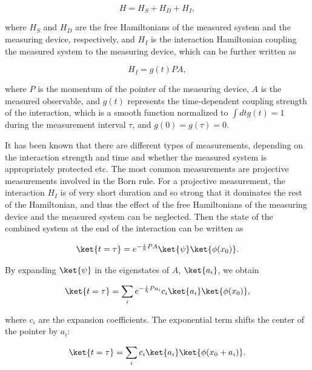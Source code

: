 \begin{equation}
H = H_S + H_D + H_I, \label{H_full}
\end{equation}

\noindent  where $H_S$ and $H_D$ are the free Hamiltonians of the measured system and the measuring device, respectively, and $H_I$ is the interaction Hamiltonian coupling the measured system to the measuring device, which can be further written as 

\begin{equation}
H_I = g(t)PA,
\label{H_int}
\end{equation} 

\noindent where $P$ is the momentum of the pointer of the measuring device, $A$ is the measured observable, and $g(t)$ represents the time-dependent coupling strength of the interaction, which is a smooth function normalized to $\int dt g(t)=1$ during the measurement interval $\tau$, and $g(0)=g(\tau)=0$. 

It has been known that there are different types of measurements, depending on the interaction strength and time and whether the measured system is appropriately protected etc. The most common measurements are projective measurements involved in the Born rule. For a projective measurement, the interaction $H_I$  is of very short duration and so strong that it dominates the rest of the Hamiltonian, and thus the effect of the free Hamiltonians of the measuring device and the measured system can be neglected. Then the state of the combined system at the end of the interaction can be written as

\begin{equation}
\ket{t=\tau} = e^{-{i\over\hbar} P A } \ket{\psi}  \ket{\phi(x_0)}.
\end{equation}

\noindent By expanding $\ket{\psi}$  in the eigenstates of $A$, $\ket{a_i}$, we obtain
 
\begin{equation}
\ket{t=\tau} = \sum_{i} e^{-{i\over\hbar} P a_i } c_i \ket{a_i} \ket{\phi(x_0)},
\end{equation}

\noindent where $c_i$ are the expansion coefficients. The exponential term shifts the center of the pointer by $a_i$:

\begin{equation}
\ket{t=\tau} = \sum_{i} c_i \ket{a_i} \ket{\phi(x_0+a_i)}.
\label{ENS}
\end{equation}

